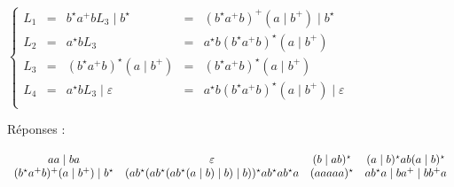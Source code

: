 \begin{corrections}
\begin{questions}
    $\left\{\begin{array}{lllllllll}
    L_1 & = & b^\star a^+ b L_3 \mid b^\star     & = & (b^\star a^+ b)^+ (a \mid b^+) \mid b^\star \\     
    L_2 & = & a^\star b L_3                     & = & a^\star b (b^\star a^+ b)^\star (a \mid b^+)\\                       
    L_3 & = & (b^\star a^+ b)^\star (a \mid b^+) & = & (b^\star a^+ b)^\star (a \mid b^+) \\ 
    L_4 & = & a^\star b L_3 \mid \varepsilon    & = & a^\star b (b^\star a^+ b)^\star (a \mid b^+) \mid \varepsilon\\      
    \end{array}\right.$
    
  \item Réponses :
  \end{questions}
  
  $\begin{array}[t]{cccc}
    aa\mid ba      &
    \varepsilon &
    (b\mid ab)^\star &
    (a\mid b)^\star ab (a\mid b)^\star\\
    (b^\star a^+ b)^+ (a \mid b^+) \mid b^\star&
    (a b^\star (a b^\star (a b^\star (a \mid b) \mid b) \mid b))^\star a b^\star a b^\star a&
    (aaaaa)^\star &
    ab^\star a\mid b a^+ \mid b b^+ a\\
  \end{array}$
  

\end{corrections}

\endgroup
\endinput
